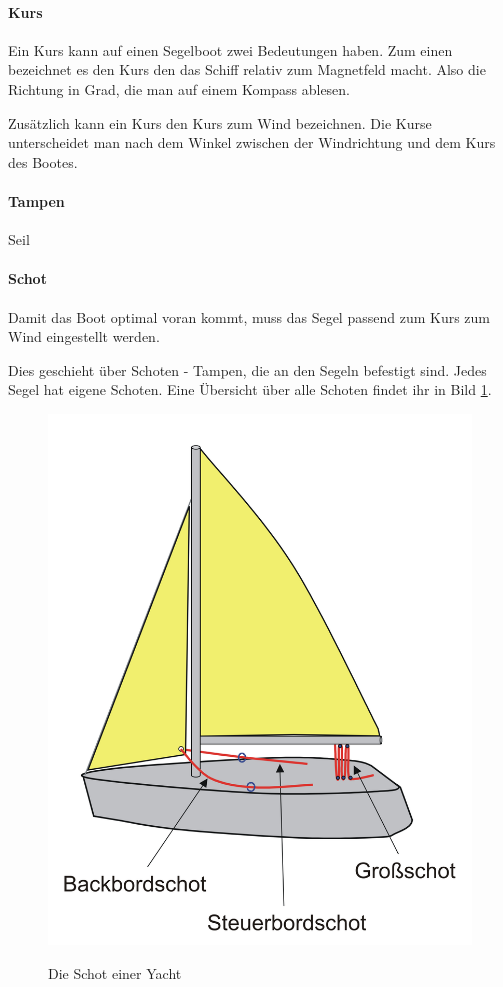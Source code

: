 \documentclass[12pt]{article}
\begin{document}
\paragraph{Kurs}
Ein Kurs kann auf einen Segelboot zwei Bedeutungen haben. Zum einen bezeichnet es den Kurs den das Schiff relativ zum Magnetfeld macht. Also die Richtung in Grad, die man auf einem Kompass ablesen.

Zusätzlich kann ein Kurs den Kurs zum Wind bezeichnen. Die Kurse unterscheidet man nach dem Winkel zwischen der Windrichtung und dem Kurs des Bootes.

\paragraph{Tampen}
Seil

\paragraph{Schot}
Damit das Boot optimal voran kommt, muss das Segel passend zum Kurs zum Wind eingestellt werden.

Dies geschieht über Schoten - Tampen, die an den Segeln befestigt sind. Jedes Segel hat eigene Schoten. Eine Übersicht über alle Schoten findet ihr in Bild \ref{schoten}.

\begin{figure}[h!]
\begin{center}
\label{schoten}
\includegraphics[scale=0.4]{bilder/schoten.png}
\end{center}
\caption{Die Schot einer Yacht}
\end{figure}
\end{document}
